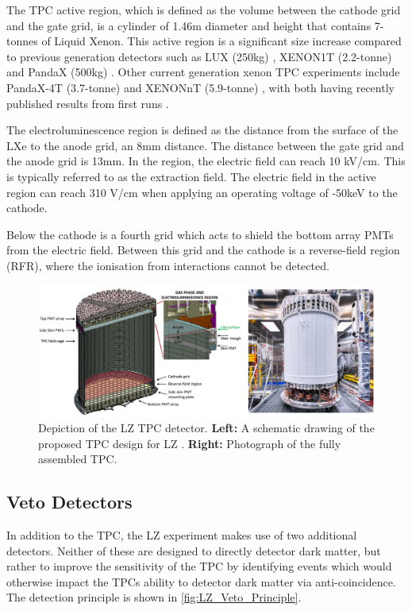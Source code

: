 \par
The TPC active region, which is defined as the volume between the cathode grid and the gate grid, is a cylinder of 1.46m diameter and height that contains 7-tonnes of Liquid Xenon.
This active region is a significant size increase compared to previous generation detectors such as LUX (250kg) \cite{lux_ref}, XENON1T (2.2-tonne) \cite{xenon1t_ref} and PandaX (500kg) \cite{pandax_ref}.
Other current generation xenon TPC experiments include PandaX-4T (3.7-tonne) \cite{pandax_4t_ref} and XENONnT (5.9-tonne) \cite{xenonnt_projected_sensitivty_ref}, with both having recently published results from first runs \cite{pandax_4t_sr1_ref,xenonnt_sr1_er_ref}. 
\par
The electroluminescence region is defined as the distance from the surface of the LXe to the anode grid, an 8mm distance.
The distance between the gate grid and the anode grid is 13mm.
In the region, the electric field can reach 10 kV/cm.
This is typically referred to as the extraction field.
The electric field in the active region can reach 310 V/cm when applying an operating voltage of -50keV to the cathode.
\par
Below the cathode is a fourth grid which acts to shield the bottom array PMTs from the electric field.
Between this grid and the cathode is a reverse-field region (RFR), where the ionisation from interactions cannot be detected.


\begin{figure}
\includegraphics[width=\columnwidth]{Figures/LZ/lz_tpc_schematic.png}%
\caption{Depiction of the LZ TPC detector.
         \textbf{Left:} A schematic drawing of the proposed TPC design for LZ \cite{LZ_TechnicalDesignReview_ref}.
         \textbf{Right:} Photograph of the fully assembled TPC.
}
\label{fig:lz_tpc_schematic}
\end{figure}


\subsection{Veto Detectors}
\label{sec:lz_veto_detectors}
\par
In addition to the TPC, the LZ experiment makes use of two additional detectors.
Neither of these are designed to directly detector dark matter, but rather to improve the sensitivity of the TPC by identifying events which would otherwise impact the TPCs ability to detector dark matter via anti-coincidence.
The detection principle is shown in \autoref{fig:LZ_Veto_Principle}.

